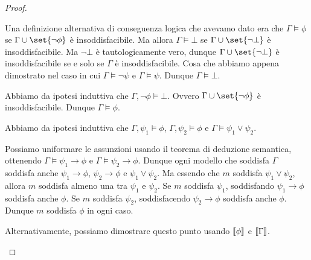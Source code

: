 \begin{proof}
\begin{description}
    Una definizione alternativa di conseguenza logica che avevamo dato era che \(\Gamma\models\phi\) se \(\Gamma\cup\set{\neg\phi}\) è insoddisfacibile. Ma allora \(\Gamma\models\bot\) se \(\Gamma\cup\set{\neg \bot}\) è insoddisfacibile. Ma \(\neg\bot\) è tautologicamente vero, dunque \(\Gamma\cup\set{\neg \bot}\) è insoddisfacibile se e solo se \(\Gamma\) è insoddisfacibile. Cosa che abbiamo appena dimostrato nel caso in cui \(\Gamma\models\neg\psi\) e \(\Gamma\models\psi\). Dunque \(\Gamma\models\bot\).

    \item[\(\RAA\).] Abbiamo da ipotesi induttiva che \(\Gamma,\neg\phi\models\bot\). Ovvero \(\Gamma\cup\set{\neg\phi}\) è insoddisfacibile. Dunque \(\Gamma\models\phi\).
    \item[\(\lor E\).] Abbiamo da ipotesi induttiva che \(\Gamma,\psi_1\models\phi\), \(\Gamma,\psi_2\models\phi\) e \(\Gamma\models\psi_1\lor\psi_2\).
    
    Possiamo uniformare le assunzioni usando il teorema di deduzione semantica, ottenendo \(\Gamma\models\psi_1\to\phi\) e \(\Gamma\models\psi_2\to\phi\). Dunque ogni modello che soddisfa \(\Gamma\) soddisfa anche \(\psi_1\to\phi\), \(\psi_2\to\phi\) e \(\psi_1\lor\psi_2\). Ma essendo che \(m\) soddisfa \(\psi_1\lor\psi_2\), allora \(m\) soddisfa almeno una tra \(\psi_1\) e \(\psi_2\). Se \(m\) soddisfa \(\psi_1\), soddisfando \(\psi_1\to\phi\) soddisfa anche \(\phi\). Se \(m\) soddisfa \(\psi_2\), soddisfacendo \(\psi_2\to\phi\) soddisfa anche \(\phi\). Dunque \(m\) soddisfa \(\phi\) in ogni caso.
    
    Alternativamente, possiamo dimostrare questo punto usando \(\den{\phi}\) e \(\den{\Gamma}\).


\end{description}
\end{proof}
